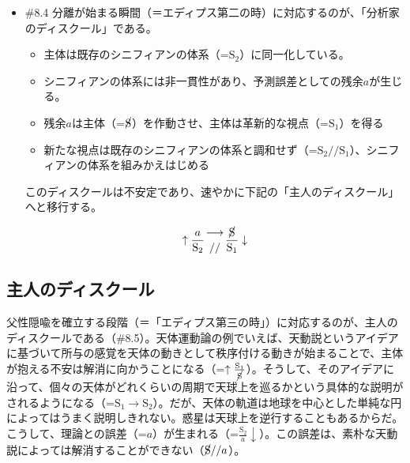 \begin{note}{}
  \begin{itemize}
    \tightlist
    \item{\#8.4}
      分離が始まる瞬間（＝エディプス第二の時）に対応するのが、「\mbox{分析家のディスクール}」である。
      \begin{itemize}
          \tightlist
          \item
          主体は既存のシニフィアンの体系（=$\textrm{S}_2$）に同一化している。
          \item
          シニフィアンの体系には非一貫性があり、\mbox{予測誤差}としての残余$a$が生じる。
          \item
          残余$a$は主体（=$\cancel{\textrm{S}}$）を作動させ、主体は革新的な視点（=$\textrm{S}_1$）を得る
          \item
          新たな視点は既存のシニフィアンの体系と調和せず（=$\textrm{S}_2//\textrm{S}_1$）、シニフィアンの体系を組みかえはじめる
        \end{itemize}このディスクールは不安定であり、速やかに下記の「\mbox{主人のディスクール}」へと移行する。

$$
\uparrow\frac{a}{\mathrm{S_2}}\genfrac{}{}{0pt}{}{\longrightarrow}{//}\frac{\cancel{\textrm{S}}}{\mathrm{S_1}}\downarrow
$$
  \end{itemize}
\end{note}

\subsection{主人のディスクール}\label{ux4e3bux4ebaux306eux30c7ux30a3ux30b9ux30afux30fcux30eb}

父性隠喩を確立する段階（＝「エディプス第三の時」）に対応するのが、\mbox{主人のディスクール}である（\#8.5）。天体運動論の例でいえば、天動説というアイデアに基づいて所与の感覚を天体の動きとして秩序付ける動きが始まることで、主体が抱える不安は解消に向かうことになる（=\(\uparrow\frac{\textrm{S}_1}{\cancel{\textrm{S}}}\)）。そうして、そのアイデアに沿って、個々の天体がどれくらいの周期で天球上を巡るかという具体的な説明がされるようになる（=\(\textrm{S}_1\rightarrow\textrm{S}_2\)）。だが、天体の軌道は地球を中心とした単純な円によってはうまく説明しきれない。惑星は天球上を逆行することもあるからだ。こうして、理論との誤差（=\(a\)）が生まれる（=\(\frac{\textrm{S}_2}{a}\downarrow\)）。この誤差は、素朴な天動説によっては解消することができない（\(\cancel{\textrm{S}}//a\)）。

